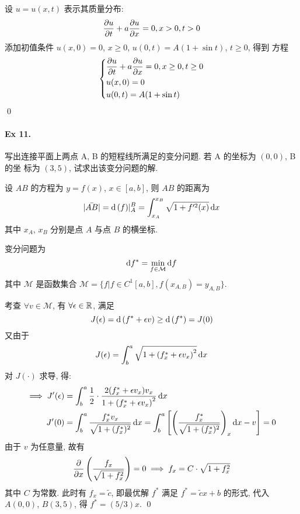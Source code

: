 \begin{solution}
设 $u = u(x, t)$ 表示其质量分布:
\[
{\frac{\partial {u}}{\partial {t}}} + a{\frac{\partial {u}}{\partial {x}}} = 0, x > 0, t > 0
\]
添加初值条件 $u(x, 0) = 0$, $x \geq 0$, $u(0, t) = A(1+\sin t)$, $t\geq 0$, 得到
方程
\[ \left\{ \begin{aligned} 
&{\frac{\partial {u}}{\partial {t}}} + a{\frac{\partial {u}}{\partial {x}}} = 0,
    x \geq 0, t \geq 0 \\
&u(x, 0) = 0 \\
&u(0, t) = A(1+\sin t)
\end{aligned} \right. \]
\qed
\end{solution}
\paragraph{Ex 11.}
写出连接平面上两点 A, B 的短程线所满足的变分问题. 若 A 的坐标为 $(0, 0)$, B 的坐
标为 $(3, 5)$, 试求出该变分问题的解.

\begin{solution}
设 $AB$ 的方程为 $y = f(x)$, $x \in [a, b]$, 则 $AB$ 的距离为
\[
|\bar{AB}| = \operatorname{d\!}\ (f)|_A^B = \int_{x_A}^{x_B} \sqrt{1 + f'^2(x)} \operatorname{d\!} x
\]
其中 $x_A$, $x_B$ 分别是点 $A$ 与点 $B$ 的横坐标.

变分问题为 
\[ \operatorname{d\!} f^* = \min_{f \in \mathcal M} \operatorname{d\!} f \]
其中 $\mathcal M$ 是函数集合
$\mathcal M = \{f | f \in C^1[a, b], f(x_{A, B}) = y_{A, B}\}$.

考查 $\forall v \in \mathcal M$, 有 $\forall \epsilon \in {\mathbb R}$, 满足
\[ J(\epsilon) = \operatorname{d\!}\ (f^* + \epsilon v) \geq \operatorname{d\!}\ (f^*) = J(0) \]
又由于
\[
J(\epsilon) = \int_b^a \sqrt{1 + \left(f^*_x + \epsilon v_x\right)^2} \operatorname{d\!} x
\]
对 $J(\cdot)$ 求导, 得:
\begin{align*}
\implies J'(\epsilon)
&= \int_b^a \frac{1}{2} \cdot
  \frac{2 (f^*_x + \epsilon v_x) v_x}{1 + \left(f^*_x + \epsilon v_x\right)^2}
  \operatorname{d\!} x \\
J'(0) &= \int_b^a
  \frac{f^*_x v_x}{\sqrt{1 + (f^*_x)^2}} \operatorname{d\!} x
  = \int_b^a
  \left[ \left( \frac{f^*_x}{\sqrt{1 + (f^*_x)^2}} \right)_x \operatorname{d\!} x - v \right]
  = 0
\end{align*}
由于 $v$ 为任意量, 故有
\[
{{\frac{\partial {}}{\partial {x}}}}\left( \frac{f_x}{\sqrt{1 + f_x^2}} \right) = 0
\implies f_x = C \cdot \sqrt{1 + f_x^2}
\]
其中 $C$ 为常数. 此时有 $f_x = \tilde c$, 即最优解 $f^*$ 满足
$f^* = \tilde c x + b$ 的形式, 代入 $A(0, 0)$, $B(3, 5)$, 得 $f^* = (5 / 3) x$.
\qed
\end{solution}
